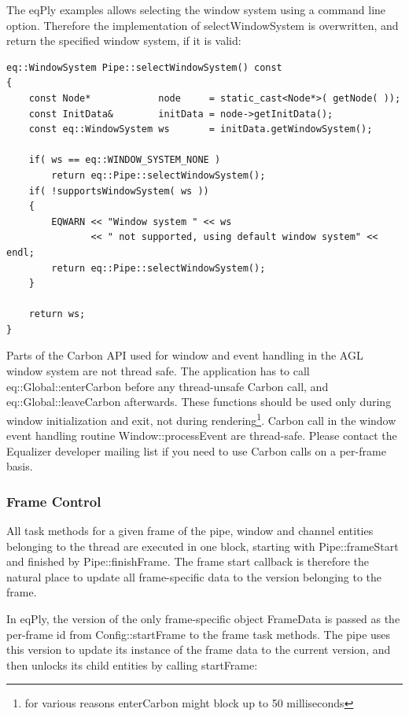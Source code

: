 \documentclass[10pt,a4]{scrartcl}
\begin{document}
The \textsf{eqPly} examples allows selecting the window system using a
command line option. Therefore the implementation of
\textsf{selectWindowSystem} is overwritten, and return the specified
window system, if it is valid:

{\footnotesize\begin{lstlisting}
eq::WindowSystem Pipe::selectWindowSystem() const
{
    const Node*            node     = static_cast<Node*>( getNode( ));
    const InitData&        initData = node->getInitData();
    const eq::WindowSystem ws       = initData.getWindowSystem();

    if( ws == eq::WINDOW_SYSTEM_NONE )
        return eq::Pipe::selectWindowSystem();
    if( !supportsWindowSystem( ws ))
    {
        EQWARN << "Window system " << ws 
               << " not supported, using default window system" << endl;
        return eq::Pipe::selectWindowSystem();
    }

    return ws;
}
\end{lstlisting}}%

Parts of the Carbon API used for window and event handling in the AGL
window system are not thread safe. The application has to call
\textsf{eq::Global::enterCarbon} before any thread-unsafe Carbon call,
and \textsf{eq::Global::leaveCarbon} afterwards. These functions should
be used only during window initialization and exit, not during
rendering\footnote{for various reasons \textsf{enterCarbon} might block
  up to 50 milliseconds}. Carbon call in the window event handling
routine \textsf{Window::processEvent} are thread-safe. Please contact
the Equalizer developer mailing list if you need to use Carbon calls on
a per-frame basis.

\subsubsection{Frame Control}

All task methods for a given frame of the pipe, window and channel
entities belonging to the thread are executed in one block, starting
with \textsf{Pipe::frameStart} and finished by
\textsf{Pipe::finishFrame}. The frame start callback is therefore the
natural place to update all frame-specific data to the version belonging
to the frame. 

In \textsf{eqPly}, the version of the only frame-specific object
\textsf{FrameData} is passed as the per-frame id from
\textsf{Config::startFrame} to the frame task methods. The pipe uses
this version to update its instance of the frame data to the current
version, and then unlocks its child entities by calling
\textsf{startFrame}:
\end{document}
